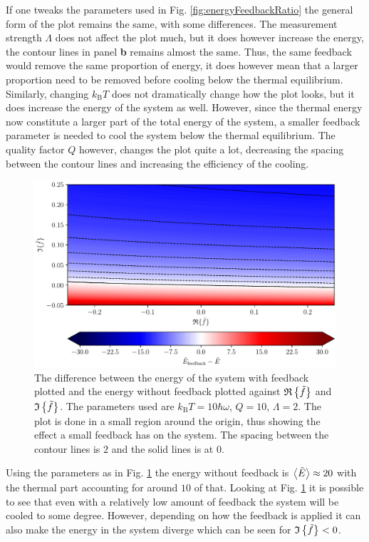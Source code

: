 If one tweaks the parameters used in Fig. \ref{fig:energyFeedbackRatio} the general form of the plot remains the same, with some differences. The measurement strength $\Lambda$ does not affect the plot much, but it does however increase the energy, the contour lines in panel \textbf{b} remains almost the same. Thus, the same feedback would remove the same proportion of energy, it does however mean that a larger proportion need to be removed before cooling below the thermal equilibrium. Similarly, changing $k_\text{B}T$ does not dramatically change how the plot looks, but it does increase the energy of the system as well. However, since the thermal energy now constitute a larger part of the total energy of the system, a smaller feedback parameter is needed to cool the system below the thermal equilibrium. The quality factor $Q$ however, changes the plot quite a lot, decreasing the spacing between the contour lines and increasing the efficiency of the cooling.

\begin{figure}[t]
    \centering
    \includegraphics[width=\textwidth]{figures/energyFeedbackDifference.pdf}
    \caption{\small The difference between the energy of the system with feedback plotted and the energy without feedback plotted against $\mathfrak{R}\left\{\tilde{f}\right\}$ and $\mathfrak{I}\left\{\tilde{f}\right\}$. The parameters used are $k_\text{B}T = 10 \hbar\omega$, $Q = 10$, $\Lambda = 2$. The plot is done in a small region around the origin, thus showing the effect a small feedback has on the system. The spacing between the contour lines is $2$ and the solid lines is at $0$.}
    \label{fig:energyFeedbackDifference}
\end{figure}

Using the parameters as in Fig. \ref{fig:energyFeedbackDifference} the energy without feedback is $\expval{\tilde{E}} \approx 20$ with the thermal part accounting for around $10$ of that. Looking at Fig. \ref{fig:energyFeedbackDifference} it is possible to see that even with a relatively low amount of feedback the system will be cooled to some degree. However, depending on how the feedback is applied it can also make the energy in the system diverge which can be seen for $\mathfrak{I}\left\{\tilde{f}\right\} < 0$.

